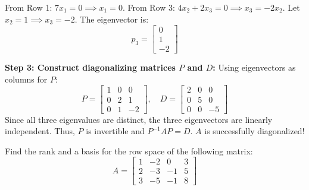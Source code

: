 \documentclass[11pt,a4paper]{article}
\begin{document}
\begin{solutionbox}
\begin{itemize}
          From Row 1: $7x_1 = 0 \implies x_1 = 0$.
          From Row 3: $4x_2 + 2x_3 = 0 \implies x_3 = -2x_2$. Let $x_2 = 1 \implies x_3 = -2$.
          The eigenvector is:
          \[ p_3 = \begin{bmatrix} 0 \\ 1 \\ -2 \end{bmatrix} \]
\end{itemize}

\textbf{Step 3: Construct diagonalizing matrices $P$ and $D$:}
Using eigenvectors as columns for $P$:
\[ P = \begin{bmatrix} 1 & 0 & 0 \\ 0 & 2 & 1 \\ 0 & 1 & -2 \end{bmatrix}, \quad D = \begin{bmatrix} 2 & 0 & 0 \\ 0 & 5 & 0 \\ 0 & 0 & -5 \end{bmatrix} \]
Since all three eigenvalues are distinct, the three eigenvectors are linearly independent. Thus, $P$ is invertible and $P^{-1}AP = D$. $A$ is successfully diagonalized!
\end{solutionbox}

\vspace{0.8cm}

\begin{questionbox}
Find the rank and a basis for the row space of the following matrix:
\[ A = \begin{bmatrix} 1 & -2 & 0 & 3 \\ 2 & -3 & -1 & 5 \\ 3 & -5 & -1 & 8 \end{bmatrix} \]
\end{questionbox}
\end{document}
